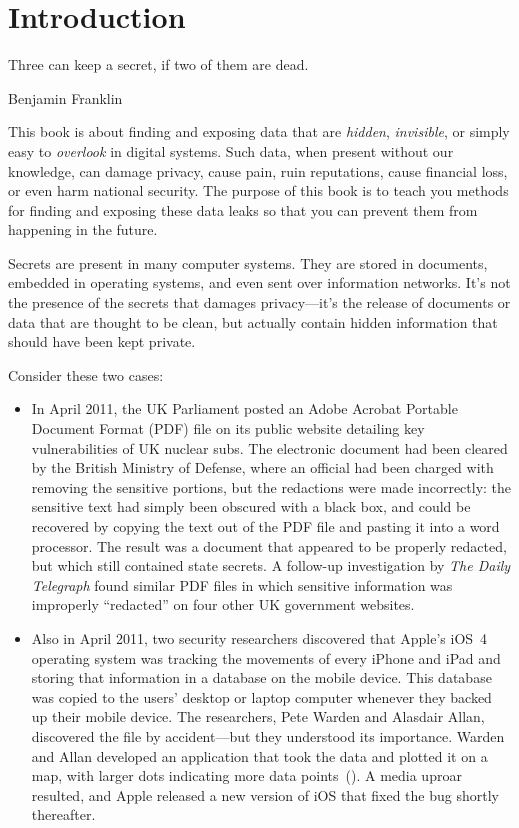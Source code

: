 \chapter{Introduction}\label{ch:introduction}
\setlength{\epigraphwidth}{3in}
\epigraph{Three can keep a secret, if two of them are dead.}{Benjamin
  Franklin}

This book is about finding and exposing data that are \emph{hidden}, \emph{invisible}, or simply
easy to \emph{overlook} in digital systems. Such data, when present
without our knowledge, can damage privacy, cause pain, ruin
reputations, cause financial loss, or even harm national security. The
purpose of this book is to teach you methods for finding and exposing
these data leaks so that you can prevent them from happening in the
future.

Secrets are present in many computer systems. They are stored in
documents, embedded in operating systems, and even sent over
information networks. It's not the presence of the secrets that
damages privacy---it's the release of documents or data that are
thought to be clean, but actually contain hidden information that
should have been kept private. 

Consider these two cases:

\begin{itemize}
\item In April 2011, the UK Parliament posted an Adobe Acrobat Portable
Document Format (PDF) file on its public website detailing key
vulnerabilities of UK nuclear subs. The electronic document had been
cleared by the British Ministry of Defense, where an official had been
charged with removing the sensitive portions, but the redactions were
made incorrectly: the sensitive text had simply been obscured with a
black box, and could be recovered by copying the text out of the PDF
file and pasting it into a word processor. The result was a document
that appeared to be properly redacted, but which still contained state
secrets.  A follow-up investigation by \emph{The Daily Telegraph}
found similar PDF files in which sensitive information was improperly
``redacted'' on four other UK government
websites\cite{telegraph-april2011-secrets}.

\item Also in April 2011, two security researchers discovered that
Apple's iOS~4 operating system was tracking the movements of every
iPhone and iPad and storing that information in a database on the
mobile device. This database was copied to the users'
desktop or laptop computer whenever they backed up their mobile
device. The researchers, Pete Warden and Alasdair Allan, discovered
the file by accident---but they understood its
importance\cite{apple-tracking}. Warden and Allan developed an application that
took the data and plotted it on a map, with larger dots indicating
more data points~(). A media uproar resulted, and
Apple released a new version of iOS that fixed the bug shortly
thereafter\cite{apple-tracking-statement}. 

\end{itemize}


